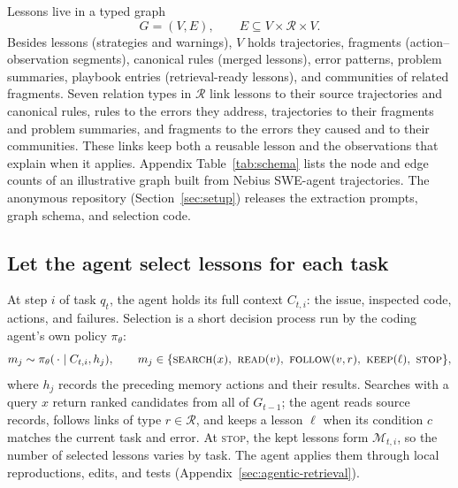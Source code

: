 Lessons live in a typed graph
\begin{equation}
 G=(V,E),\qquad E\subseteq V\times\mathcal R\times V.
 \label{eq:experience-graph}
\end{equation}
Besides lessons (strategies and warnings), $V$ holds trajectories, fragments
(action--observation segments), canonical rules (merged lessons), error
patterns, problem summaries, playbook entries (retrieval-ready lessons), and
communities of related fragments. Seven relation types in $\mathcal R$ link
lessons to their source trajectories and canonical rules, rules to the
errors they address, trajectories to their fragments and problem summaries,
and fragments to the errors they caused and to their communities. These links
keep both a reusable lesson and the observations that explain when it
applies. Appendix Table~\ref{tab:schema} lists the node and edge counts of
an illustrative graph built from Nebius SWE-agent trajectories. The anonymous
repository (Section~\ref{sec:setup}) releases the extraction prompts, graph
schema, and selection code.

\subsection{Let the agent select lessons for each task}
\label{sec:experience-retrieval}
At step $i$ of task $q_t$, the agent holds its full context $C_{t,i}$: the
issue, inspected code, actions, and failures. Selection is a short decision
process run by the coding agent's own policy $\pi_\theta$:
\begin{equation}
 m_j\sim\pi_\theta(\,\cdot\mid C_{t,i},h_j),\qquad
 m_j\in\{\textsc{search}(x),\ \textsc{read}(v),\ \textsc{follow}(v,r),\ \textsc{keep}(\ell),\ \textsc{stop}\},
 \label{eq:agent-selection}
\end{equation}
where $h_j$ records the preceding memory actions and their results. Searches
with a query $x$ return ranked candidates from all of $G_{t-1}$; the agent reads source
records, follows links of type $r\in\mathcal R$, and keeps a lesson $\ell$
when its condition $c$ matches the current task and error. At
\textsc{stop}, the kept lessons form $\mathcal M_{t,i}$, so the number of
selected lessons varies by task. The agent applies them through local
reproductions, edits, and tests (Appendix~\ref{sec:agentic-retrieval}).

